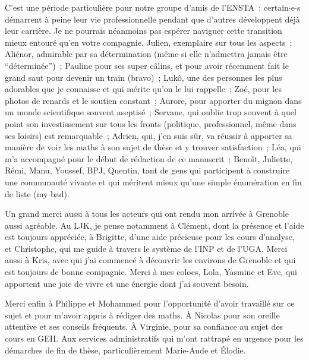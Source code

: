 C'est une période particulière pour notre groupe d'amis de l'ENSTA~: certain$\cdot$e$\cdot$s démarrent à peine leur vie professionnelle pendant que d'autres développent déjà leur carrière. Je ne pourrais néanmoins pas espérer naviguer cette transition mieux entouré qu'en votre compagnie. Julien, exemplaire sur tous les aspects~; Aliénor, admirable par sa détermination (même si elle n'admettra jamais être \enquote{déterminée})~; Pauline pour ses super câlins, et pour avoir récemment fait le grand saut pour devenir un train (bravo)~; Lukô, une des personnes les plus adorables que je connaisse et qui mérite qu'on le lui rappelle~; Zoé, pour les photos de renards et le soutien constant~; Aurore, pour apporter du mignon dans un monde scientifique souvent aseptisé~; Servane, qui oublie trop souvent à quel point son investissement sur tous les fronts (politique, professionnel, même dans ses loisirs) est remarquable~; Adrien, qui, j'en suis sûr, va réussir à apporter sa manière de voir les maths à son sujet de thèse et y trouver satisfaction~; Léa, qui m'a accompagné pour le début de rédaction de ce manuscrit~; Benoît, Juliette, Rémi, Manu, Youssef, BPJ, Quentin, tant de gens qui participent à construire une communauté vivante et qui méritent mieux qu'une simple énumération en fin de liste (my bad).

Un grand merci aussi à tous les acteurs qui ont rendu mon arrivée à Grenoble aussi agréable. Au LJK, je pense notamment à Clément, dont la présence et l'aide est toujours appréciée, à Brigitte, d'une aide précieuse pour les cours d'analyse, et Christophe, qui me guide à travers le système de l'INP et de l'UGA. Merci aussi à Kris, avec qui j'ai commencé à découvrir les environs de Grenoble et qui est toujours de bonne compagnie. Merci à mes colocs, Lola, Yasmine et Eve, qui apportent une joie de vivre et une énergie dont j'ai souvent besoin.

Merci enfin à Philippe et Mohammed pour l'opportunité d'avoir travaillé sur ce sujet et pour m'avoir appris à rédiger des maths. À Nicolas pour son oreille attentive et ses conseils fréquents. À Virginie, pour sa confiance au sujet des cours en GEII. Aux services administratifs qui m'ont rattrapé en urgence pour les démarches de fin de thèse, particulièrement Marie-Aude et Élodie. 
